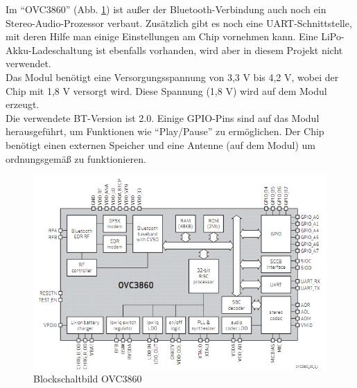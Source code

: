 \newpage
Im \enquote{OVC3860} (Abb. \ref {fig:3.3.2}) ist außer der Bluetooth-Verbindung auch noch ein Stereo-Audio-Prozessor verbaut.
Zusätzlich gibt es noch eine UART-Schnittstelle, mit deren Hilfe man einige Einstellungen am Chip vornehmen kann.
Eine LiPo-Akku-Ladeschaltung ist ebenfalls vorhanden, wird aber in diesem Projekt nicht verwendet.
\\
Das Modul benötigt eine Versorgungsspannung von 3,3 V bis 4,2 V, wobei der Chip mit 1,8 V versorgt wird.
Diese Spannung (1,8 V) wird auf dem Modul erzeugt.
\\
Die verwendete BT-Version ist 2.0.
Einige GPIO-Pins sind auf das Modul herausgeführt, um Funktionen wie \enquote{Play/Pause} zu ermöglichen.
Der Chip benötigt einen externen Speicher und eine Antenne (auf dem Modul) um ordnungsgemäß zu funktionieren.
\begin{figure} [H]
	\centering
	\includegraphics[width=1\textwidth]{img/BTModul/blockschaltbild.png}
	\caption[Blockschaltbild OVC3860]{Blockschaltbild OVC3860\footnotemark}\label {fig:3.3.2}
\end{figure}

\newpage
